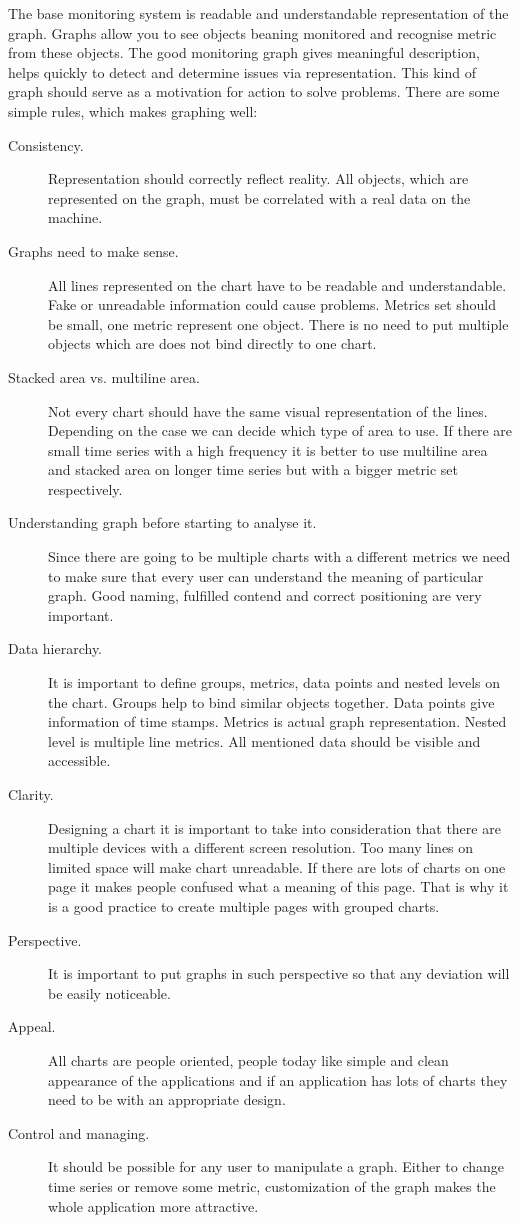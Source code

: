 The base monitoring system is readable and understandable representation of the graph. Graphs allow you to see objects beaning monitored and recognise metric from these objects. 
The good monitoring graph gives meaningful description, helps quickly to detect and determine issues via representation. This kind of graph should serve as a motivation for action to solve problems. 
There are some simple rules, which makes graphing well:

\begin{description}
\item[Consistency.] Representation should correctly reflect reality. All objects, which are represented on the graph, must be correlated with a real data on the machine. 
\item[Graphs need to make sense.]  All lines represented on the chart have to be readable and understandable.  Fake or unreadable information could cause problems. Metrics set should be small, one metric represent one object. There is no need to put multiple objects which are does not bind directly to one chart.
\item[Stacked area vs. multiline area.] Not every chart should have the same visual representation of the lines. Depending on the case we can decide which type of area to use.  If there are small time series with a high frequency it is better to use multiline area and stacked area on longer time series but with a bigger metric set respectively. 
\item[Understanding graph before starting to analyse it. ] Since there are going to be multiple charts with a different metrics we need to make sure that every user can understand the meaning of particular graph. Good naming, fulfilled contend and correct positioning are very important.
\item[Data hierarchy. ] It is important to define groups, metrics, data points and nested levels on the chart.  Groups help to bind similar objects together. Data points give information of time stamps. Metrics is actual graph representation. Nested level is multiple line metrics. All mentioned data should be visible and accessible. 
\item[Clarity.] Designing a chart it is important to take into consideration that there are multiple devices with a different screen resolution. Too many lines on limited space will make chart unreadable.  If there are lots of charts on one page it makes people confused what a meaning of this page. That is why it is a good practice to create multiple pages with grouped charts. 
\item[Perspective.] It is important to put graphs in such perspective so that any deviation will be easily noticeable. 
\item[Appeal.] All charts are people oriented, people today like simple and clean appearance of the applications and if an application has lots of charts they need to be with an appropriate design.  
\item[Control and managing.] It should be possible for any user to manipulate a graph. Either to change time series or remove some metric, customization of the graph makes the whole application more attractive.
\end{description}

